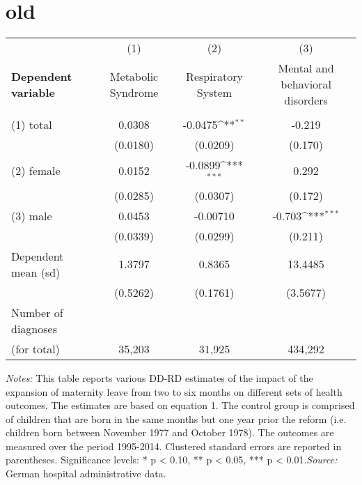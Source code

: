 \documentclass[11pt, a4paper]{article} %
\begin{document}
\newpage \newpage
\section{old}
 \begin{table}[H]
 \begin{threeparttable} \centering 
 {\def\sym#1{\ifmmode^{#1}\else\(^{#1}\)\fi} 
 

\begin{tabular}{lccc}
\toprule
&\multicolumn{1}{c}{(1)}&\multicolumn{1}{c}{(2)}&\multicolumn{1}{c}{(3)}\\
\textbf{Dependent variable} & Metabolic Syndrome & Respiratory System & Mental and behavioral disorders \\ 
\midrule
\\
(1) {total} & 0.0308 & -0.0475\sym{**} & -0.219 \\ 
  & (0.0180) & (0.0209) & (0.170) \\ 
(2) {female} & 0.0152 & -0.0899\sym{***} & 0.292 \\  
 & (0.0285) & (0.0307) & (0.172) \\ 
(3) {male} & 0.0453 & -0.00710 & -0.703\sym{***} \\ 
& (0.0339) & (0.0299) & (0.211) \\
\midrule
Dependent mean (sd)&	1.3797	& 0.8365 & 13.4485 \\
& (0.5262) 		& (0.1761) & (3.5677) \\
Number of diagnoses  \\
(for total)& 35,203 & 31,925 & 434,292 \\
\bottomrule
\end{tabular}}
\begin{tablenotes} \item \scriptsize \emph{Notes:} This table reports various DD-RD estimates of the impact of the expansion of maternity leave from two to six months on different sets of health outcomes. The estimates are based on equation 1. The control group is comprised of children that are born in the same months but one year prior the reform (i.e. children born between November 1977 and October 1978). The outcomes are measured over the period 1995-2014. Clustered standard errors are reported in parentheses. Significance levels: * p < 0.10, ** p < 0.05, *** p < 0.01.\newline \emph{Source:} German hospital administrative data. \end{tablenotes} \end{threeparttable} \end{table} 
\end{document}

